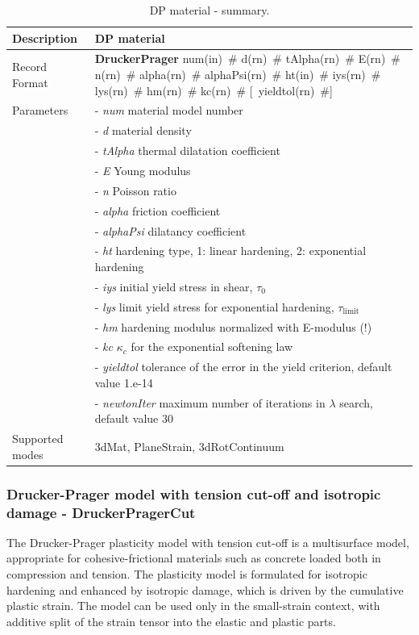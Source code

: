 \documentclass[a4paper]{article}
\newcommand{\descitem}[1]{{\noindent \bf #1}}
\newcommand{\elemparam}[2]{{{#1\tiny (#2)}~\#}}
\newcommand{\optelemparam}[2]{[{~\elemparam{#1}{#2}}]}
\newcommand{\param}[1]{{\it #1}}
\begin{document}
\begin{table}[!htb]
\begin{tabular}{|l|p{9cm}|}
\hline
Description & DP material\\
\hline
Record Format & \descitem{DruckerPrager} \elemparam{num}{in}
\elemparam{d}{rn} \elemparam{tAlpha}{rn} \elemparam{E}{rn} \elemparam{n}{rn}
\elemparam{alpha}{rn} \elemparam{alphaPsi}{rn} \elemparam{ht}{in}
\elemparam{iys}{rn} \elemparam{lys}{rn} \elemparam{hm}{rn} \elemparam{kc}{rn} \optelemparam{yieldtol}{rn} \\
Parameters &- \param{num} material model number\\
&- \param{d} material density\\
&- \param{tAlpha} thermal dilatation coefficient\\
&- \param{E} Young modulus\\
&- \param{n} Poisson ratio\\
&- \param{alpha} friction coefficient\\
&- \param{alphaPsi}  dilatancy coefficient\\
&- \param{ht} hardening type, 1: linear hardening, 2: exponential
hardening\\
&- \param{iys} initial yield stress in shear, $\tau_0$\\
&- \param{lys} limit yield stress for exponential hardening, $\tau_{\mathrm{limit}}$\\
&- \param{hm} hardening modulus normalized with E-modulus (!)\\
&- \param{kc} $\kappa_c$ for the exponential softening law\\
&- \param{yieldtol} tolerance of the error in the yield criterion, default value
1.e-14\\
&- \param{newtonIter} maximum number of iterations in $\lambda$ search, default value 30\\
Supported modes& 3dMat, PlaneStrain, 3dRotContinuum\\
\hline
\end{tabular}
\caption{DP material - summary.}
\label{DP_table}
\end{table}

\subsubsection{Drucker-Prager model with tension cut-off and isotropic damage - DruckerPragerCut}
\label{DPCutmodel}
The Drucker-Prager plasticity model with tension cut-off is a multisurface model, appropriate for cohesive-frictional 
materials such as concrete loaded both in compression and tension. The plasticity model is formulated for isotropic 
hardening and enhanced by isotropic damage, which is driven by the cumulative plastic strain. The model can be used 
only in the small-strain context, with additive split of the strain tensor into the elastic and plastic parts.
\end{document}
